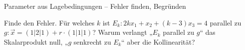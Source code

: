 \begin{aufgabe}{Parameter aus Lagebedingungen – Fehler finden, Begründen}
\begin{teile}
\teil Finde den Fehler. Für welches $k$ ist $E_k: 2k x_1 + x_2 + (k - 3) x_3 = 4$ parallel zu $g: \vec{x} = (1 | 2 | 1) + r \cdot (1 | 1 | 1)$? 
\teil Warum verlangt „$E_k$ parallel zu $g$“ das Skalarprodukt null, „$g$ senkrecht zu $E_k$“ aber die Kollinearität?
\end{teile}
\end{aufgabe}
